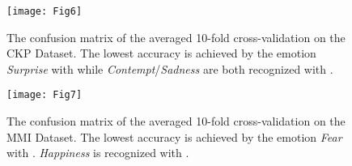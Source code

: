 \documentclass[10pt,journal,compsoc, hidelinks]{IEEEtran}
\newcommand{\paraV}{\vspace{1em}}
\begin{document}
\begin{table}[b]
\centering
\caption{The CKP database has been very well analyzed and the best possible recognition accuracy has been achieved by Aliya Zafar. It is noteworthy that the samples he used for training are not randomly selected and no cross-validation has been applied. Evaluating this database provides information whether the proposed approach can compete with those results.}
\label{tab:ckp_results}

\end{table}


\begin{figure*}[ht!]
\centering
\begin{subfigure}[b]{0.46\textwidth}
\centering
\texttt{[image: Fig6]}
\caption{The confusion matrix of the averaged 10-fold cross-validation on the CKP Dataset. The lowest accuracy is achieved by the emotion \textit{Surprise} with  while \textit{Contempt}/\textit{Sadness} are both recognized with .}
\label{fig:ckp_conf}
\end{subfigure}
\hspace{0.05\textwidth}
\begin{subfigure}[b]{0.46\textwidth}
\centering
\texttt{[image: Fig7]}
\caption{The confusion matrix of the averaged 10-fold cross-validation on the MMI Dataset. The lowest accuracy is achieved by the emotion \textit{Fear} with . \textit{Happiness} is recognized with .\\~}
\label{fig:mmi_conf}
\end{subfigure}
\end{figure*}


\paraV
\end{document}
